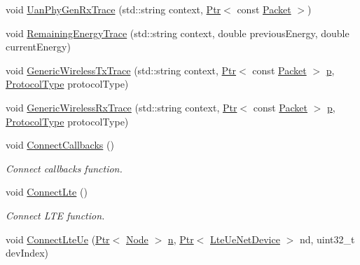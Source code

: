 \begin{DoxyCompactItemize}
\item 
void \hyperlink{classns3_1_1AnimationInterface_a8ced521c1d66785fd2920ec0fe52fee4}{Uan\+Phy\+Gen\+Rx\+Trace} (std\+::string context, \hyperlink{classns3_1_1Ptr}{Ptr}$<$ const \hyperlink{classns3_1_1Packet}{Packet} $>$)
\item 
void \hyperlink{classns3_1_1AnimationInterface_a37b79091bdb14b5fe94e1b3f7a90d58a}{Remaining\+Energy\+Trace} (std\+::string context, double previous\+Energy, double current\+Energy)
\item 
void \hyperlink{classns3_1_1AnimationInterface_a1a0a1b2f00918cdccb9893f044b73da3}{Generic\+Wireless\+Tx\+Trace} (std\+::string context, \hyperlink{classns3_1_1Ptr}{Ptr}$<$ const \hyperlink{classns3_1_1Packet}{Packet} $>$ \hyperlink{lte__link__budget__x2__handover__measures_8m_ac9de518908a968428863f829398a4e62}{p}, \hyperlink{classns3_1_1AnimationInterface_a801a4efd553ff0d1d768cd70d22456b6}{Protocol\+Type} protocol\+Type)
\item 
void \hyperlink{classns3_1_1AnimationInterface_adf54784892a11509eee9c15d7ded8bef}{Generic\+Wireless\+Rx\+Trace} (std\+::string context, \hyperlink{classns3_1_1Ptr}{Ptr}$<$ const \hyperlink{classns3_1_1Packet}{Packet} $>$ \hyperlink{lte__link__budget__x2__handover__measures_8m_ac9de518908a968428863f829398a4e62}{p}, \hyperlink{classns3_1_1AnimationInterface_a801a4efd553ff0d1d768cd70d22456b6}{Protocol\+Type} protocol\+Type)
\item 
void \hyperlink{classns3_1_1AnimationInterface_a3475aa338984f2024403caa04c146027}{Connect\+Callbacks} ()
\begin{DoxyCompactList}\small\item\em Connect callbacks function. \end{DoxyCompactList}\item 
void \hyperlink{classns3_1_1AnimationInterface_a921e35bb00b2d0032dde4147bd2a200e}{Connect\+Lte} ()
\begin{DoxyCompactList}\small\item\em Connect L\+TE function. \end{DoxyCompactList}\item 
void \hyperlink{classns3_1_1AnimationInterface_a30a06abf385e5a74951ee74147e897dc}{Connect\+Lte\+Ue} (\hyperlink{classns3_1_1Ptr}{Ptr}$<$ \hyperlink{classns3_1_1Node}{Node} $>$ \hyperlink{lte__link__budget__x2__handover__measures_8m_abdb05bc5a064cf642a06c83b3392f148}{n}, \hyperlink{classns3_1_1Ptr}{Ptr}$<$ \hyperlink{classns3_1_1LteUeNetDevice}{Lte\+Ue\+Net\+Device} $>$ nd, uint32\+\_\+t dev\+Index)
\item 

\end{DoxyCompactItemize}
